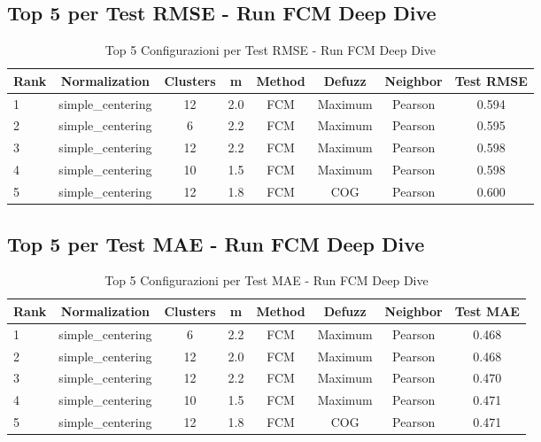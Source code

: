\subsection{Top 5 per Test RMSE - Run FCM Deep Dive}
\begin{table}[h]
    \centering
    \caption{Top 5 Configurazioni per Test RMSE - Run FCM Deep Dive}
    \begin{tabular}{|l|c|c|c|c|c|c|c|}
    \hline
    \textbf{Rank} & \textbf{Normalization} & \textbf{Clusters} & \textbf{m} & \textbf{Method} & \textbf{Defuzz} & \textbf{Neighbor} & \textbf{Test RMSE} \\
    \hline
    1 & simple\_centering & 12 & 2.0 & FCM & Maximum & Pearson & 0.594 \\
    2 & simple\_centering & 6 & 2.2 & FCM & Maximum & Pearson & 0.595 \\
    3 & simple\_centering & 12 & 2.2 & FCM & Maximum & Pearson & 0.598 \\
    4 & simple\_centering & 10 & 1.5 & FCM & Maximum & Pearson & 0.598 \\
    5 & simple\_centering & 12 & 1.8 & FCM & COG & Pearson & 0.600 \\
    \hline
    \end{tabular}
    \end{table}

\subsection{Top 5 per Test MAE - Run FCM Deep Dive}
\begin{table}[h]
    \centering
    \caption{Top 5 Configurazioni per Test MAE - Run FCM Deep Dive}
    \begin{tabular}{|l|c|c|c|c|c|c|c|}
    \hline
    \textbf{Rank} & \textbf{Normalization} & \textbf{Clusters} & \textbf{m} & \textbf{Method} & \textbf{Defuzz} & \textbf{Neighbor} & \textbf{Test MAE} \\
    \hline
    1 & simple\_centering & 6 & 2.2 & FCM & Maximum & Pearson & 0.468 \\
    2 & simple\_centering & 12 & 2.0 & FCM & Maximum & Pearson & 0.468 \\
    3 & simple\_centering & 12 & 2.2 & FCM & Maximum & Pearson & 0.470 \\
    4 & simple\_centering & 10 & 1.5 & FCM & Maximum & Pearson & 0.471 \\
    5 & simple\_centering & 12 & 1.8 & FCM & COG & Pearson & 0.471 \\
    \hline
    \end{tabular}
    \end{table}

